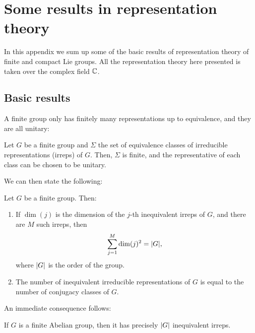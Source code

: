 \chapter{Some results in representation theory}
\label{app:some_results_in_representation_theory}

In this appendix we sum up some of the basic results of representation theory of finite and compact Lie groups.
All the representation theory here presented is taken over the complex field $\mathbb{C}$.

\section{Basic results}
\label{sec:basic_results}

A finite group only has finitely many representations up to equivalence, and they are all unitary:

\begin{theorem}
    Let $G$ be a finite group and $\Sigma$ the set of equivalence classes of irreducible representations (irreps) of $G$.
    Then, $\Sigma$ is finite, and the representative of each class can be chosen to be unitary.
\end{theorem}

We can then state the following:

\begin{theorem}[Burnside]\label{th:burnside}
    Let $G$ be a finite group.
    Then:
    \begin{enumerate}
        \item If $\dim(j) $ is the dimension of the $j$-th inequivalent irreps of $G$, and there are $M$ such irreps, then
            \begin{equation}
                \sum_{j = 1}^{M} \dim(j)^2 = \abs{G},
                \label{eq:burnside_th_dim}
            \end{equation}
        where $\abs{G}$ is the order of the group.

        \item The number of inequivalent irreducible representations of $G$ is equal to the number of conjugacy classes of $G$.
    \end{enumerate}
\end{theorem}

An immediate consequence follows:

\begin{corollary}
    If $G$ is a finite Abelian group, then it has precisely $\abs{G}$  inequivalent irreps.
\end{corollary}


